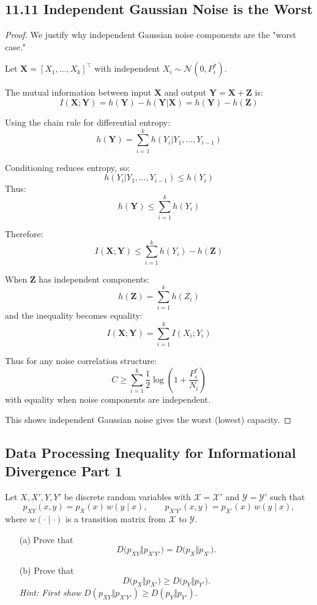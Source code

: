 \documentclass[../main.tex]{subfiles}
\begin{document}
\subsection*{11.11 Independent Gaussian Noise is the Worst}
\begin{proof}
We justify why independent Gaussian noise components are the "worst case."

Let $\mathbf{X} = [X_1,\ldots,X_k]^\top$ with independent $X_i \sim \mathcal{N}(0,P_i^*)$.

The mutual information between input $\mathbf{X}$ and output $\mathbf{Y} = \mathbf{X} + \mathbf{Z}$ is:
\[ I(\mathbf{X};\mathbf{Y}) = h(\mathbf{Y}) - h(\mathbf{Y}|\mathbf{X}) = h(\mathbf{Y}) - h(\mathbf{Z}) \]

Using the chain rule for differential entropy:
\[ h(\mathbf{Y}) = \sum_{i=1}^k h(Y_i|Y_1,\ldots,Y_{i-1}) \]

Conditioning reduces entropy, so:
\[ h(Y_i|Y_1,\ldots,Y_{i-1}) \leq h(Y_i) \]
Thus:
\[ h(\mathbf{Y}) \leq \sum_{i=1}^k h(Y_i) \]

Therefore:
\[ I(\mathbf{X};\mathbf{Y}) \leq \sum_{i=1}^k h(Y_i) - h(\mathbf{Z}) \]

When $\mathbf{Z}$ has independent components:
\[ h(\mathbf{Z}) = \sum_{i=1}^k h(Z_i) \]
and the inequality becomes equality:
\[ I(\mathbf{X};\mathbf{Y}) = \sum_{i=1}^k I(X_i;Y_i) \]

Thus for any noise correlation structure:
\[ C \geq \sum_{i=1}^k \frac{1}{2}\log\left(1 + \frac{P_i^*}{N_i}\right) \]
with equality when noise components are independent.

This shows independent Gaussian noise gives the worst (lowest) capacity.
\end{proof}



\subsection*{Data Processing Inequality for Informational Divergence Part 1}

Let $X,X',Y,Y'$ be discrete random variables with $\mathcal X=\mathcal X'$ and $\mathcal Y=\mathcal Y'$ such that
\[
p_{XY}(x,y)=p_X(x)\,w(y\mid x),
\qquad
p_{X'Y'}(x,y)=p_{X'}(x)\,w(y\mid x),
\]
where $w(\cdot\mid\cdot)$ is a transition matrix from $\mathcal X$ to $\mathcal Y$.  
\begin{enumerate}
\item[(a)] Prove that
\[D\bigl(p_{XY}\Vert p_{X'Y'}\bigr) 
= D\bigl(p_X\Vert p_{X'}\bigr).
\]
\item[(b)] Prove that
\[D\bigl(p_X\Vert p_{X'}\bigr) \ge D\bigl(p_Y\Vert p_{Y'}\bigr).
\]
\emph{Hint: First show }$D(p_{XY}\Vert p_{X'Y'})\ge D(p_Y\Vert p_{Y'})$.
\end{enumerate}
\end{document}
